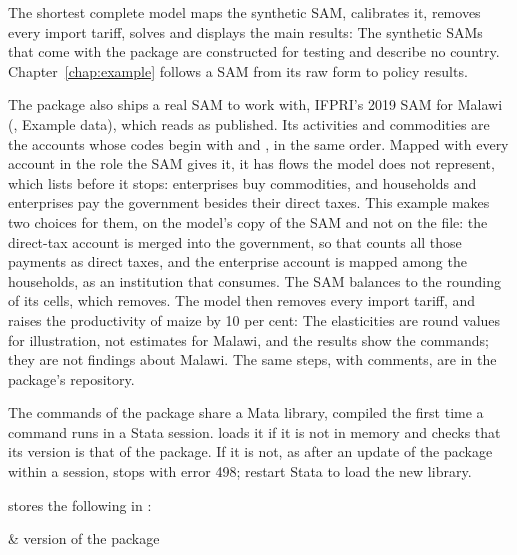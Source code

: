 
The shortest complete model maps the synthetic SAM, calibrates it, removes
every import tariff, solves and displays the main results:
The synthetic SAMs that come with the package are constructed for testing and
describe no country. Chapter~\ref{chap:example} follows a SAM from its raw
form to policy results.


The package also ships a real SAM to work with, IFPRI's 2019 SAM for Malawi
(, Example data), which  reads as published.
Its activities and commodities are the accounts whose codes begin with
 and , in the same order. Mapped with every account in the role
the SAM gives it, it has flows the model does not represent, which
 lists before it stops: enterprises buy commodities, and
households and enterprises pay the government besides their direct taxes.
This example makes two choices for them, on the model's copy of the SAM and
not on the file: the direct-tax account is merged into the government, so
that  counts all those payments as direct taxes, and the
enterprise account is mapped among the households, as an institution that
consumes. The SAM balances to the rounding of its cells, which
 removes. The model then removes every import tariff,
and raises the productivity of maize by 10 per cent:
The elasticities are round values for illustration, not estimates for
Malawi, and the results show the commands; they are not findings about
Malawi. The same steps, with comments, are  in the
package's repository.


The commands of the package share a Mata library, compiled the first time a
command runs in a Stata session.  loads it if it is not in memory and
checks that its version is that of the package. If it is not, as after an
update of the package within a session,  stops with error 498;
restart Stata to load the new library.


 stores the following in :
\begin{storedres}
 & version of the package\\
\end{storedres}


